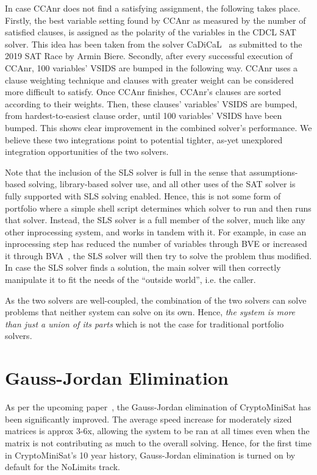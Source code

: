 \documentclass[final]{ieee}
\begin{document}
In case CCAnr does not find a satisfying assignment, the following takes place. Firstly, the best variable setting found by CCAnr as measured by the number of satisfied clauses, is assigned as the polarity of the variables in the CDCL SAT solver. This idea has been taken from the solver CaDiCaL~\cite{cadical} as submitted to the 2019 SAT Race by Armin Biere.
%
Secondly, after every successful execution of CCAnr, 100 variables' VSIDS are bumped in the following way. CCAnr uses a clause weighting technique and clauses with greater weight can be considered more difficult to satisfy. Once CCAnr finishes, CCAnr's clauses are sorted according to their weights. Then, these clauses' variables' VSIDS are bumped, from hardest-to-easiest clause order, until 100 variables' VSIDS have been bumped.
% 
This shows clear improvement in the combined solver's performance. We believe these two integrations point to potential tighter, as-yet unexplored integration opportunities of the two solvers.

Note that the inclusion of the SLS solver is full in the sense that assumptions-based solving, library-based solver use, and all other uses of the SAT solver is fully supported with SLS solving enabled. Hence, this is not some form of portfolio where a simple shell script determines which solver to run and then runs that solver. Instead, the SLS solver is a full member of the solver, much like any other inprocessing system, and works in tandem with it. For example, in case an inprocessing step has reduced the number of variables through BVE or increased it through BVA~\cite{BVA}, the SLS solver will then try to solve the problem thus modified. In case the SLS solver finds a solution, the main solver will then correctly manipulate it to fit the needs of the ``outside world'', i.e. the caller.

As the two solvers are well-coupled, the combination of the two solvers can solve problems that neither system can solve on its own. Hence, \emph{the system is more than just a union of its parts} which is not the case for traditional portfolio solvers.

\section{Gauss-Jordan Elimination}
As per the upcoming paper~\cite{birdtwo}, the Gauss-Jordan elimination of CryptoMiniSat has been significantly improved. The average speed increase for moderately sized matrices is approx 3-6x, allowing the system to be ran at all times even when the matrix is not contributing as much to the overall solving. Hence, for the first time in CryptoMiniSat's 10 year history, Gauss-Jordan elimination is turned on by default for the NoLimits track.
\end{document}
